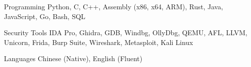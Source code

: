 

\begin{cvskills}

  \cvskill
    {Programming} %
    {Python, C, C++, Assembly (x86, x64, ARM), Rust, Java, JavaScript, Go, Bash, SQL} %

  \cvskill
    {Security Tools} %
    {IDA Pro, Ghidra, GDB, Windbg, OllyDbg, QEMU, AFL, LLVM, Unicorn, Frida, Burp Suite, Wireshark, Metasploit, Kali Linux} %

  \cvskill
    {Languages} %
    {Chinese (Native), English (Fluent)} %

\end{cvskills}
